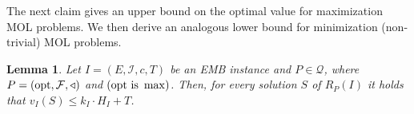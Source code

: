 \documentclass[11pt,letter]{article}
\newcommand{\opt}{\textnormal{opt}}
\newcommand{\cQ}{{\mathcal{Q}}}
\newcommand{\cI}{{\mathcal{I}}}
\newcommand{\cF}{{\mathcal{F}}}
\newtheorem{lemma}{Lemma}[section]
\begin{document}
The next claim gives an upper bound on the optimal value for maximization MOL problems. We then derive an analogous lower bound for minimization (non-trivial) MOL problems. 











	\begin{lemma}
	\label{lem:OptMaxBound}
	Let $I =(E,\cI,c,T)$ be an \textnormal{EMB} instance and $P \in \cQ$, where $P = (\opt,\cF,\triangleleft)$ and $\left(\opt \textnormal{ is } \max\right)$. Then, for every solution $S$ of $R_P(I)$ it holds that $v_I(S) \leq k_I \cdot H_I+T$.  %
\end{lemma}
\end{document}

